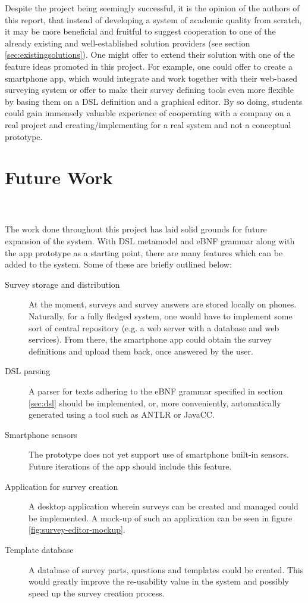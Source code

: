 Despite the project being seemingly successful, it is the opinion of the authors of this report, that instead of developing a system of academic quality from scratch, it may be more beneficial and fruitful to suggest cooperation to one of the already existing and well-established solution providers (see section \ref{sec:existingsolutions}). One might offer to extend their solution with one of the feature ideas promoted in this project. For example, one could offer to create a smartphone app, which would integrate and work together with their web-based surveying system or offer to make their survey defining tools even more flexible by basing them on a DSL definition and a graphical editor.
By so doing, students could gain immensely valuable experience of cooperating with a company on a real project and creating/implementing for a real system and not a conceptual prototype.

\section{Future Work}
\label{sec:futurework}
\kim \\\\
The work done throughout this project has laid solid grounds for future expansion of the system. With DSL metamodel and eBNF grammar along with the app prototype as a starting point, there are many features which can be added to the system. Some of these are briefly outlined below:
\begin{description}
\item[Survey storage and distribution] At the moment, surveys and survey answers are stored locally on phones. Naturally, for a fully fledged system, one would have to implement some sort of central repository (e.g. a web server with a database and web services). From there, the smartphone app could obtain the survey definitions and upload them back, once answered by the user.
\item[DSL parsing] A parser for texts adhering to the eBNF grammar specified in section \ref{sec:dsl} should be implemented, or, more conveniently, automatically generated using a tool such as ANTLR or JavaCC.
\item[Smartphone sensors] The prototype does not yet support use of smartphone built-in sensors. Future iterations of the app should include this feature.
\item[Application for survey creation] A desktop application wherein surveys can be created and managed could be implemented. A mock-up of such an application can be seen in figure \ref{fig:survey-editor-mockup}.
\item[Template database] A database of survey parts, questions and templates could be created. This would greatly improve the re-usability value in the system and possibly speed up the survey creation process.
\end{description}

